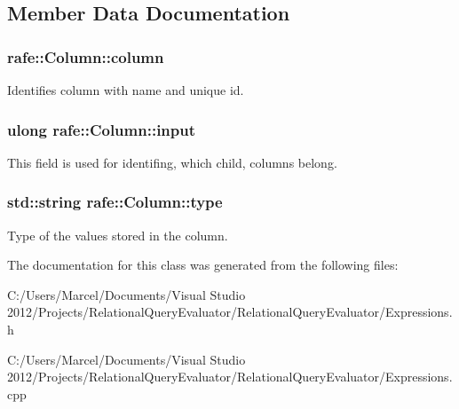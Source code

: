 \subsection{Member Data Documentation}
\hypertarget{classrafe_1_1_column_a7d991e6ad44729235c31910dcc885c5d}{
\subsubsection[{column}]{ rafe\+::\+Column\+::column}}\label{classrafe_1_1_column_a7d991e6ad44729235c31910dcc885c5d}
Identifies column with name and unique id. \hypertarget{classrafe_1_1_column_a1d4d38a6c74a83602c193c5a51f20780}{
\subsubsection[{input}]{\setlength{\rightskip}{0pt plus 5cm}ulong rafe\+::\+Column\+::input}}\label{classrafe_1_1_column_a1d4d38a6c74a83602c193c5a51f20780}
This field is used for identifing, which child, columns belong. \hypertarget{classrafe_1_1_column_a3e812878630c51153a69f372b1472ce6}{
\subsubsection[{type}]{\setlength{\rightskip}{0pt plus 5cm}std\+::string rafe\+::\+Column\+::type}}\label{classrafe_1_1_column_a3e812878630c51153a69f372b1472ce6}
Type of the values stored in the column. 

The documentation for this class was generated from the following files\+:\begin{DoxyCompactItemize}
\item 
C\+:/\+Users/\+Marcel/\+Documents/\+Visual Studio 2012/\+Projects/\+Relational\+Query\+Evaluator/\+Relational\+Query\+Evaluator/Expressions.\+h\item 
C\+:/\+Users/\+Marcel/\+Documents/\+Visual Studio 2012/\+Projects/\+Relational\+Query\+Evaluator/\+Relational\+Query\+Evaluator/Expressions.\+cpp\end{DoxyCompactItemize}
